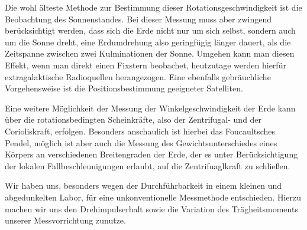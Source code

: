 \documentclass[halfparskip, 11pt]{scrartcl}
\begin{document}
Die wohl älteste Methode zur Bestimmung dieser Rotationsgeschwindigkeit ist die Beobachtung des Sonnenstandes.
Bei dieser Messung muss aber zwingend berücksichtigt werden, dass sich die Erde nicht nur um sich selbst, sondern auch um die Sonne dreht, eine Erdumdrehung also geringfügig länger dauert, als die Zeitspanne zwischen zwei Kulminationen der Sonne. Umgehen kann man diesen Effekt, wenn man direkt einen Fixstern beobachet, heutzutage werden hierfür extragalaktische Radioquellen herangezogen. Eine ebenfalls gebräuchliche Vorgehensweise ist die Positionsbestimmung geeigneter Satelliten.

Eine weitere Möglichkeit der Messung der Winkelgeschwindigkeit der Erde kann über die rotationsbedingten Scheinkräfte, also der Zentrifugal- und der Corioliskraft, erfolgen. Besonders anschaulich ist hierbei das Foucaultsches Pendel, möglich ist aber auch die Messung des Gewichtsunterschiedes eines Körpers an verschiedenen Breitengraden der Erde, der es unter Berücksichtigung der lokalen Fallbeschleunigungen erlaubt, auf die Zentrifuaglkraft zu schließen. 

Wir haben uns, besonders wegen der Durchführbarkeit in einem kleinen und abgedunkelten Labor, für eine unkonventionelle Messmethode entschieden. Hierzu machen wir uns den Drehimpulserhalt sowie die Variation des Tr\"agheitsmoments unserer Messvorrichtung zunutze.
\end{document}
